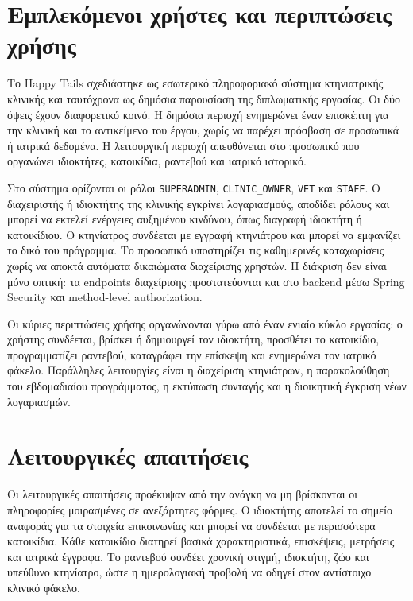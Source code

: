\section{Εμπλεκόμενοι χρήστες και περιπτώσεις χρήσης}

Το Happy Tails σχεδιάστηκε ως εσωτερικό πληροφοριακό σύστημα κτηνιατρικής
κλινικής και ταυτόχρονα ως δημόσια παρουσίαση της διπλωματικής εργασίας. Οι
δύο όψεις έχουν διαφορετικό κοινό. Η δημόσια περιοχή ενημερώνει έναν
επισκέπτη για την κλινική και το αντικείμενο του έργου, χωρίς να παρέχει
πρόσβαση σε προσωπικά ή ιατρικά δεδομένα. Η λειτουργική περιοχή απευθύνεται
στο προσωπικό που οργανώνει ιδιοκτήτες, κατοικίδια, ραντεβού και ιατρικό
ιστορικό.

Στο σύστημα ορίζονται οι ρόλοι \texttt{SUPERADMIN},
\texttt{CLINIC\_OWNER}, \texttt{VET} και \texttt{STAFF}. Ο διαχειριστής ή
ιδιοκτήτης της κλινικής εγκρίνει λογαριασμούς, αποδίδει ρόλους και μπορεί να
εκτελεί ενέργειες αυξημένου κινδύνου, όπως διαγραφή ιδιοκτήτη ή κατοικίδιου.
Ο κτηνίατρος συνδέεται με εγγραφή κτηνιάτρου και μπορεί να εμφανίζει το δικό
του πρόγραμμα. Το προσωπικό υποστηρίζει τις καθημερινές καταχωρίσεις χωρίς
να αποκτά αυτόματα δικαιώματα διαχείρισης χρηστών. Η διάκριση δεν είναι μόνο
οπτική: τα endpoints διαχείρισης προστατεύονται και στο backend μέσω Spring
Security και method-level authorization.

Οι κύριες περιπτώσεις χρήσης οργανώνονται γύρω από έναν ενιαίο κύκλο
εργασίας: ο χρήστης συνδέεται, βρίσκει ή δημιουργεί τον ιδιοκτήτη, προσθέτει
το κατοικίδιο, προγραμματίζει ραντεβού, καταγράφει την επίσκεψη και ενημερώνει
τον ιατρικό φάκελο. Παράλληλες λειτουργίες είναι η διαχείριση κτηνιάτρων, η
παρακολούθηση του εβδομαδιαίου προγράμματος, η εκτύπωση συνταγής και η
διοικητική έγκριση νέων λογαριασμών.

\section{Λειτουργικές απαιτήσεις}

Οι λειτουργικές απαιτήσεις προέκυψαν από την ανάγκη να μη βρίσκονται οι
πληροφορίες μοιρασμένες σε ανεξάρτητες φόρμες. Ο ιδιοκτήτης αποτελεί το
σημείο αναφοράς για τα στοιχεία επικοινωνίας και μπορεί να συνδέεται με
περισσότερα κατοικίδια. Κάθε κατοικίδιο διατηρεί βασικά χαρακτηριστικά,
επισκέψεις, μετρήσεις και ιατρικά έγγραφα. Το ραντεβού συνδέει χρονική στιγμή,
ιδιοκτήτη, ζώο και υπεύθυνο κτηνίατρο, ώστε η ημερολογιακή προβολή να οδηγεί
στον αντίστοιχο κλινικό φάκελο.


